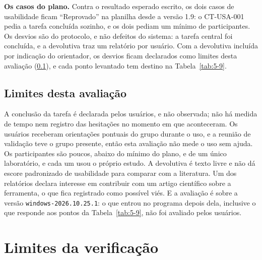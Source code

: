 \textbf{Os casos do plano.} Contra o resultado esperado escrito, os dois casos de usabilidade ficam ``Reprovado'' na planilha desde a versão 1.9: o CT-USA-001 pedia a tarefa concluída sozinho, e os dois pediam um mínimo de participantes. Os desvios são do protocolo, e não defeitos do sistema: a tarefa central foi concluída, e a devolutiva traz um relatório por usuário. Com a devolutiva incluída por indicação do orientador, os desvios ficam declarados como limites desta avaliação (\ref{sec:5-4-5}), e cada ponto levantado tem destino na Tabela~\ref{tab:5-9}.

\subsection{Limites desta avaliação}\label{sec:5-4-5}

A conclusão da tarefa é declarada pelos usuários, e não observada; não há medida de tempo nem registro das hesitações no momento em que aconteceram. Os usuários receberam orientações pontuais do grupo durante o uso, e a reunião de validação teve o grupo presente, então esta avaliação não mede o uso sem ajuda. Os participantes são poucos, abaixo do mínimo do plano, e de um único laboratório, e cada um usou o próprio estudo. A devolutiva é texto livre e não dá escore padronizado de usabilidade para comparar com a literatura. Um dos relatórios declara interesse em contribuir com um artigo científico sobre a ferramenta, o que fica registrado como possível viés. E a avaliação é sobre a versão \texttt{windows-\allowbreak{}2026.\allowbreak{}10.\allowbreak{}25.\allowbreak{}1}: o que entrou no programa depois dela, inclusive o que responde aos pontos da Tabela~\ref{tab:5-9}, não foi avaliado pelos usuários.

\section{Limites da verificação}\label{sec:5-5}

